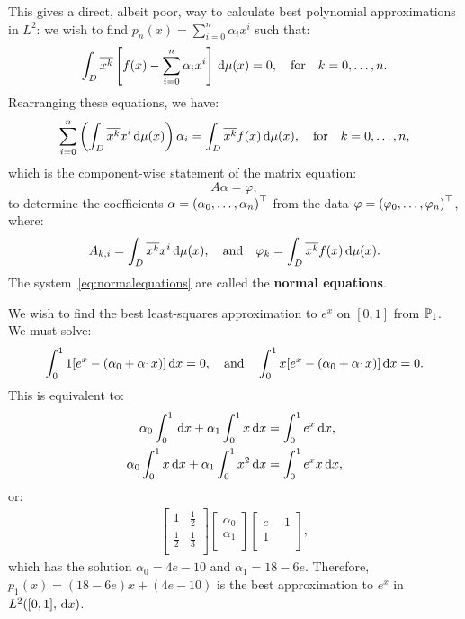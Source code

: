 This gives a direct, albeit poor, way to calculate best polynomial approximations in $L^2$: we wish to find $p_n(x) = \sum_{i=0}^n \alpha_i x^i$ such that:
\begin{equation}
\int_D \conj{x^k}\br[f(x)-\sum_{i=0}^n \alpha_i x^i]\ud\mu(x) = 0,\quad{\rm for}\quad k=0,\ldots,n.
\end{equation}
Rearranging these equations, we have:
\begin{equation}
\sum_{i=0}^n\left(\int_D\conj{x^k}x^i\ud\mu(x)\right)\alpha_i = \int_D \conj{x^k}f(x)\ud\mu(x),\quad{\rm for}\quad k=0,\ldots,n,
\end{equation}
which is the component-wise statement of the matrix equation:
\begin{equation}\label{eq:normalequations}
A\alpha = \varphi,
\end{equation}
to determine the coefficients $\alpha = \pr(\alpha_0,\ldots,\alpha_n)^\top$ from the data $\varphi = \pr(\varphi_0,\ldots,\varphi_n)^\top$, where:
\begin{equation}
A_{k,i} = \int_D \conj{x^k}x^i\ud\mu(x),\quad{\rm and}\quad \varphi_k = \int_D \conj{x^k}f(x)\ud\mu(x).
\end{equation}
The system~\eqref{eq:normalequations} are called the {\bf normal equations}.

\begin{example}
We wish to find the best least-squares approximation to $e^x$ on $[0,1]$ from $\P_1$. We must solve:
\[
\int_0^1 1[e^x -(\alpha_0+\alpha_1x)]\ud x = 0,\quad{\rm and}\quad \int_0^1 x[e^x -(\alpha_0+\alpha_1x)]\ud x = 0.
\]
This is equivalent to:
\begin{align*}
\alpha_0\int_0^1\ud x + \alpha_1\int_0^1x\ud x & = \int_0^1 e^x\ud x,\\
\alpha_0\int_0^1x\ud x + \alpha_1\int_0^1x^2\ud x & = \int_0^1 e^xx\ud x,
\end{align*}
or:
\begin{align*}
\begin{bmatrix}
1 & \frac{1}{2}\\
\frac{1}{2} & \frac{1}{3}\\
\end{bmatrix}
\begin{bmatrix}
\alpha_0\\\alpha_1\\
\end{bmatrix}
\begin{bmatrix}
e-1\\1\\
\end{bmatrix},
\end{align*}
which has the solution $\alpha_0 = 4e-10$ and $\alpha_1 = 18-6e$. Therefore, $p_1(x) = (18-6e)x + (4e-10)$ is the best approximation to $e^x$ in $L^2([0,1],\ud x)$.
\end{example}

